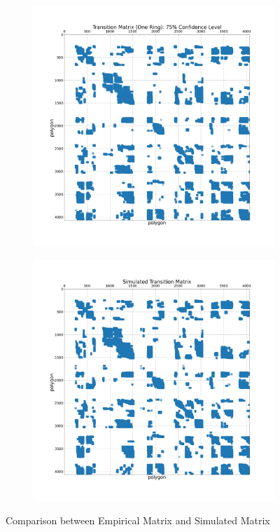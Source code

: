 \documentclass[12pt]{article}
\theoremstyle{definition}
\begin{document}
\begin{figure}
  \centering
  \begin{subfigure}[t]{0.6\textwidth}
    \includegraphics[width=\textwidth]{TM_1.png}
    \caption{}
  \end{subfigure}
  \begin{subfigure}[t]{0.6\textwidth}
    \includegraphics[width=\textwidth]{SIM_TM.png}
    \caption{}
  \end{subfigure}
  \caption{Comparison between Empirical Matrix and Simulated Matrix}
  \label{fig:sim_tm}
\end{figure}
\end{document}
